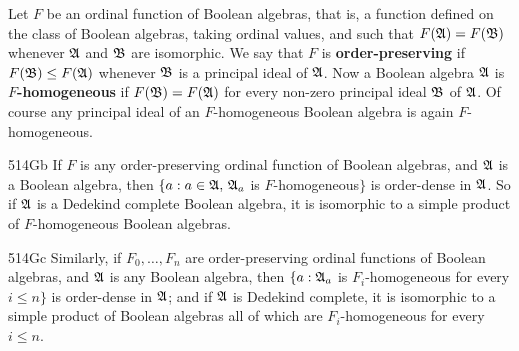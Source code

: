  Let
$F$ be an ordinal function of Boolean algebras, that is, a function
defined on the class of Boolean algebras, taking ordinal values, and
such that $F(\frak A)=F(\frak B)$ whenever $\frak A$ and $\frak B$ are
isomorphic.   We say that $F$ is {\bf order-preserving} if
$F(\frak B)\le F(\frak A)$ whenever $\frak B$ is a principal ideal of
$\frak A$.      Now a Boolean algebra $\frak A$ is
{\bf $F$-homogeneous} if $F(\frak B)=F(\frak A)$ for every non-zero
principal ideal $\frak B$ of $\frak A$.   Of course any principal ideal
of an $F$-homogeneous Boolean algebra is again $F$-homogeneous.


\spheader 514Gb If $F$ is any order-preserving ordinal function of
Boolean algebras, and $\frak A$ is a Boolean algebra,
then $\{a:a\in\frak A,\,\frak A_a$ is $F$-homogeneous$\}$ is
order-dense in $\frak A$.      So if $\frak A$ is a Dedekind complete Boolean
algebra, it is isomorphic to a simple product of $F$-homogeneous Boolean
algebras.   

\spheader 514Gc Similarly, if $F_0,\ldots,F_n$ are order-preserving
ordinal functions of Boolean algebras, and $\frak A$ is any Boolean
algebra, then $\{a:\frak A_a$ is $F_i$-homogeneous for every $i\le n\}$
is order-dense in $\frak A$;  and if $\frak A$ is Dedekind complete, it
is isomorphic to a simple product of Boolean algebras all of which are
$F_i$-homogeneous for every $i\le n$.


